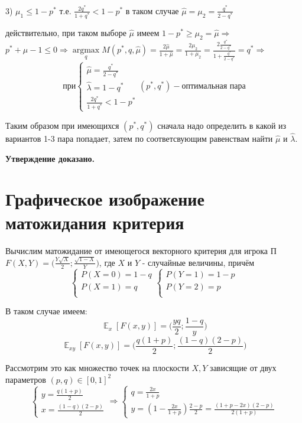 \documentclass[letterpaper,12pt, reqno]{article}
\DeclareMathOperator*{\argmax}{argmax} %
\DeclareMathOperator*{\E}{\mathbb{E}}
\begin{document}
\begin{flushleft}
3) $\mu_1 \leq 1-p^{*}$ т.е. $\frac{2q^{*}}{1+q^{*}} < 1-p^{*}$
в таком случае $\hat{\mu}=\mu_2=\frac{q^{*}}{2-q^{*}}$ 

действительно, при таком выборе $\hat{\mu}$ имеем $1-p^{*} \geq \mu_2 = \hat\mu \Rightarrow$
$p^{*}+\mu-1 \leq 0 \Rightarrow \argmax\limits_{q}M(p^{*},q,\hat{\mu})=
\frac{2\hat\mu}{1+\hat\mu}=\frac{2\mu_2}{1+\mu_2}=\frac{2\frac{q^{*}}{2-q^{*}}}{1+\frac{q^{*}}{2-q^{*}}}=
q^{*} \Rightarrow$ 
\[
\textrm{при}
\begin{cases}
\hat\mu=\frac{q^{*}}{2-q^{*}} \\
\hat\lambda = 1 - q^{*} \\
\frac{2q^{*}}{1+q^{*}} < 1-p^{*}
\end{cases}
(p^{*}, q^{*}) - \textrm{оптимальная пара}
\] 

Таким образом при имеющихся $(p^{*},q^{*})$ сначала надо определить в какой из вариантов 1-3 пара попадает, затем
по соответсвующим равенствам найти $\hat\mu$ и $\hat\lambda$.

\textbf{Утверждение доказано.}

\section{Графическое изображение матожидания критерия}
Вычислим матожидание от имеющегося векторного критерия для игрока П
$F(X, Y) = \big(\frac{Y\sqrt{X}}{2};\frac{\sqrt{1-X}}{Y}\big)$, где $X$ и $Y$ - случайные величины, причём
\[
\begin{cases}
P(X=0)=1-q \\
P(X=1)=q \\
\end{cases}
\begin{cases}
P(Y=1)=1-p \\
P(Y=2)=p \\
\end{cases}
\]

В таком случае имеем:
\begin{equation}
\E_{x} [F(x,y)]=\big(\frac{yq}{2};\frac{1-q}{y}\big)
\end{equation}
\begin{equation}
\E_{xy} [F(x,y)]=\big(\frac{q(1+p)}{2};\frac{(1-q)(2-p)}{2}\big)
\end{equation}

Рассмотрим это как множество точек на плоскости $X,Y$ зависящие от двух параметров $(p,q)\in[0,1]^2$
\[
\begin{cases}
y=\frac{q(1+p)}{2} \\
x=\frac{(1-q)(2-p)}{2}  
\end{cases}
\Rightarrow
\begin{cases}
q=\frac{2x}{1+p} \\
y=(1-\frac{2x}{1+p})\frac{2-p}{2}=\frac{(1+p-2x)(2-p)}{2(1+p)}
\end{cases}
\]


\end{flushleft}
\end{document}
